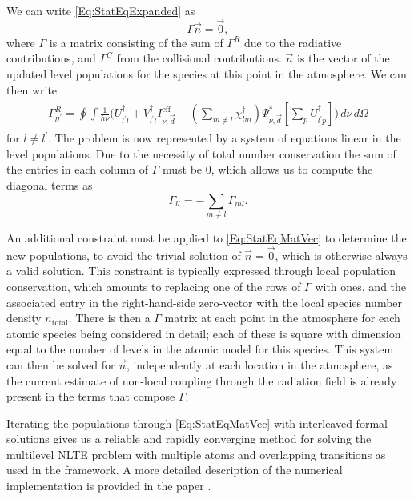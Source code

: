 We can write \eqref{Eq:StatEqExpanded} as
\begin{equation}
    \Gamma \vec{n} = \vec{0},
    \label{Eq:StatEqMatVec}
\end{equation}
where $\Gamma$ is a matrix consisting of the sum of $\Gamma^R$ due to the radiative contributions, and $\Gamma^C$ from the collisional contributions. $\vec{n}$ is the vector of the updated level populations for the species at this point in the atmosphere.
We can then write
\begin{align}
\begin{split}\label{Eq:GammaR}
    \Gamma^R_{ll^\prime} = \oint \int \frac{1}{h\nu} \bigg( U^\dagger_{l^\prime l} + V^\dagger_{l^\prime l}I_{\nu, \vec{d}}^\mathrm{eff} -
    \left(\sum_{m\neq l}\chi^\dagger_{lm}\right) \Psi^*_{\nu, \vec{d}} \left[ \sum_p U^\dagger_{l^\prime p} \right] \bigg)\, d\nu\,d\Omega
\end{split}
\end{align}
for $l\neq l^\prime$.
The problem is now represented by a system of equations linear in the level populations.
Due to the necessity of total number conservation the sum of the entries in each column of $\Gamma$ must be 0, which allows us to compute the diagonal terms as
\begin{equation}
    \Gamma_{ll} = -\sum_{m\neq l} \Gamma_{ml}.
\end{equation}

An additional constraint must be applied to \eqref{Eq:StatEqMatVec} to determine the new populations, to avoid the trivial solution of $\vec{n} = \vec{0}$, which is otherwise always a valid solution.
This constraint is typically expressed through local population conservation, which amounts to replacing one of the rows of $\Gamma$ with ones, and the associated entry in the right-hand-side zero-vector with the local species number density $n_\mathrm{total}$.
There is then a $\Gamma$ matrix at each point in the atmosphere for each atomic species being considered in detail; each of these is square with dimension equal to the number of levels in the atomic model for this species.
This system can then be solved for $\vec{n}$, independently at each location in the atmosphere, as the current estimate of non-local coupling through the radiation field is already present in the terms that compose $\Gamma$.

Iterating the populations through \eqref{Eq:StatEqMatVec} with interleaved formal solutions gives us a reliable and rapidly converging method for solving the multilevel NLTE problem with multiple atoms and overlapping transitions as used in the \Lw{} framework.
A more detailed description of the numerical implementation is provided in the \Lw{} paper \citep{Osborne2021}.

